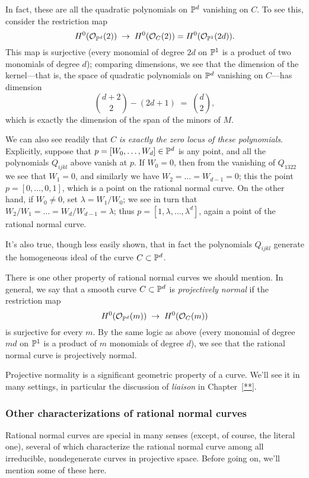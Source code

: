 In fact, these are all the quadratic polynomials on ${\mathbb P}^d$ vanishing on $C$. To see this, consider the restriction map
$$
H^0({\mathcal O}_{{\mathbb P}^d}(2)) \; \to \; H^0({\mathcal O}_{C}(2)) = H^0({\mathcal O}_{{\mathbb P}^1}(2d)).
$$
This map is surjective (every monomial of degree $2d$ on ${\mathbb P}^1$ is a product of two monomials of degree $d$); comparing dimensions, we see that the dimension of the kernel---that is, the space of quadratic polynomials on ${\mathbb P}^d$ vanishing on $C$---has dimension
$$
\binom{d+2}{2} - (2d+1) \; = \; \binom{d}{2},
$$
which is exactly the dimension of the span of the minors of $M$. 

We can also see readily that $C$ \emph{is exactly the zero locus of these polynomials}. Explicitly, suppose that $p = [W_0,\dots,W_d] \in {\mathbb P}^d$ is any point, and all the polynomials $Q_{ijkl}$ above vanish at $p$. If $W_0 = 0$, then from the vanishing of $Q_{1322}$ we see that $W_1 = 0$, and similarly we have $W_2 = \dots = W_{d-1}=0$; this the point $p = [0,\dots,0,1]$, which is a point on the rational normal curve. On the other hand, if $W_0 \neq 0$, set $\lambda = W_1/W_0$; we see in turn that $W_2/W_1 = \dots = W_d/W_{d-1} = \lambda$; thus $p = [1, \lambda, \dots,\lambda^d]$, again a point of the rational normal curve.

It's also true, though less easily shown, that in fact the polynomials $Q_{ijkl}$  generate the homogeneous ideal of the curve $C \subset {\mathbb P}^d$.

There is one other property of rational normal curves we should mention. In general, we say that a smooth curve $C \subset {\mathbb P}^d$ is \emph{projectively normal} if the restriction map
$$
H^0({\mathcal O}_{{\mathbb P}^d}(m)) \; \to \; H^0({\mathcal O}_{C}(m)) 
$$
is surjective for every $m$. By the same logic as above (every monomial of degree $md$ on ${\mathbb P}^1$ is a product of $m$ monomials of degree $d$), we see that the rational normal curve is projectively normal. 

Projective normality is a significant geometric property of a curve. We'll see it in many settings, in particular the discussion of \emph{liaison} in Chapter~\ref{**}.

\subsubsection{Other characterizations of rational normal curves}

Rational normal curves are special in many senses (except, of course, the literal one), several of which characterize the rational normal curve among all irreducible, nondegenerate curves in projective space. Before going on, we'll mention some of these here.


